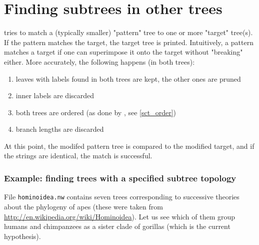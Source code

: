 \section{Finding subtrees in other trees}
\label{sct_match}

\match{} tries to match a (typically smaller) "pattern" tree to one or more
"target" tree(s). If the pattern matches the target, the target tree is
printed. Intuitively, a pattern matches a target if one can superimpose it onto
the target without "breaking" either. More accurately, the following happens
(in both trees):
\begin{enumerate}
	\item leaves with labels found in both trees are kept, the other ones are
		pruned
	\item inner labels are discarded
	\item both trees are ordered (as done by \order{}, see  \ref{sct_order})
	\item branch lengths are discarded
\end{enumerate}
At this point, the modifed pattern tree is compared to the modified target, and if the \nw{} strings are identical, the match is successful.

\subsubsection{Example: finding trees with a specified  subtree topology}

File \texttt{hominoidea.nw} contains seven trees corresponding to successive
theories about the phylogeny of apes (these were taken from
\url{http://en.wikipedia.org/wiki/Hominoidea}). Let us see which of them group
humans and chimpanzees as a sister clade of gorillas (which is the current
hypothesis).


